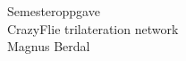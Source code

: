 \documentclass[a4paper]{article}
\begin{document}
\begin{titlepage}
\begin{center}
\Large Semesteroppgave\\
\vspace{10pt}
\Large CrazyFlie trilateration network\\
\vspace{10pt}
\large Magnus Berdal
\end{center}
\end{titlepage}
\clearpage
\tableofcontents










\end{document}
